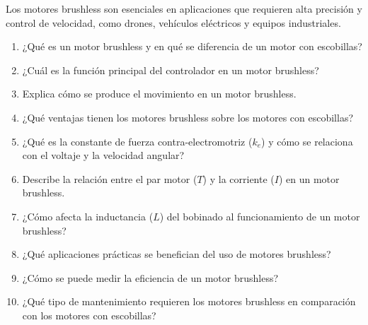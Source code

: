 \documentclass[../main]{subfiles}
\begin{document}
Los motores brushless son esenciales en aplicaciones que requieren alta precisión y control de velocidad, como drones, vehículos eléctricos y equipos industriales.

\begin{enumerate}
\item ¿Qué es un motor brushless y en qué se diferencia de un motor con escobillas?
\item ¿Cuál es la función principal del controlador en un motor brushless?
\item Explica cómo se produce el movimiento en un motor brushless.
\item ¿Qué ventajas tienen los motores brushless sobre los motores con escobillas?
\item ¿Qué es la constante de fuerza contra-electromotriz ($k_e$) y cómo se relaciona con el voltaje y la velocidad angular?
\item Describe la relación entre el par motor ($T$) y la corriente ($I$) en un motor brushless.
\item ¿Cómo afecta la inductancia ($L$) del bobinado al funcionamiento de un motor brushless?
\item ¿Qué aplicaciones prácticas se benefician del uso de motores brushless?
\item ¿Cómo se puede medir la eficiencia de un motor brushless?
\item ¿Qué tipo de mantenimiento requieren los motores brushless en comparación con los motores con escobillas?

\end{enumerate}
\end{document}
